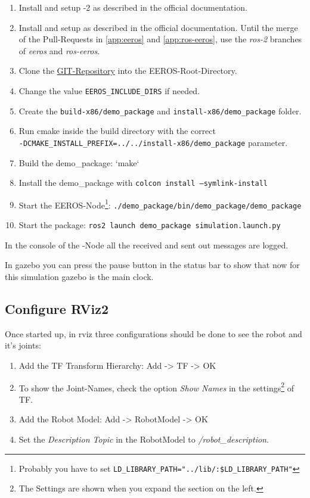 \begin{enumerate}
    \item Install and setup -2 as described in the official documentation.
    \item Install and setup  as described in the official documentation.
    Until the merge of the Pull-Requests in \ref{app:eeros} and \ref{app:ros-eeros}, use the \textit{ros-2} branches of \textit{eeros} and \textit{ros-eeros}.
    \item Clone the \href{https://github.com/LukyLuke/mse_vt_eeros}{GIT-Repository} into the EEROS-Root-Directory.
    \item Change the value \texttt{EEROS\_INCLUDE\_DIRS} if needed.
    \item Create the \texttt{build-x86/demo\_package} and \texttt{install-x86/demo\_package} folder.
    \item Run cmake inside the build directory with the correct\\
    \texttt{-DCMAKE\_INSTALL\_PREFIX=../../install-x86/demo\_package} parameter.
    \item Build the demo\_package: `make`
    \item Install the demo\_package with \texttt{colcon install --symlink-install}
    \item Start the EEROS-Node\footnote{Probably you have to set \texttt{LD\_LIBRARY\_PATH="../lib/:\$LD\_LIBRARY\_PATH"}}: \texttt{./demo\_package/bin/demo\_package/demo\_package}
    \item Start the package: \texttt{ros2 launch demo\_package simulation.launch.py}
\end{enumerate}

In the console of the -Node all the received and sent out messages are logged.

In \Gls{gazebo} you can press the pause button in the status bar to show that now for this simulation \Gls{gazebo} is the main clock.


\subsection[Rviz2 Config]{Configure RViz2} \label{sec:demo-rviz2-config}

Once started up, in \Gls{rviz} three configurations should be done to see the robot and it's joints:

\begin{enumerate}
    \item Add the TF Transform Hierarchy: Add -> TF -> OK
    \item To show the Joint-Names, check the option \textit{Show Names} in the settings\footnote{The Settings are shown when you expand the section on the left.} of TF.
    \item Add the Robot Model: Add -> RobotModel -> OK
    \item Set the \textit{Description Topic} in the RobotModel to \textit{/robot\_description}.
\end{enumerate}

